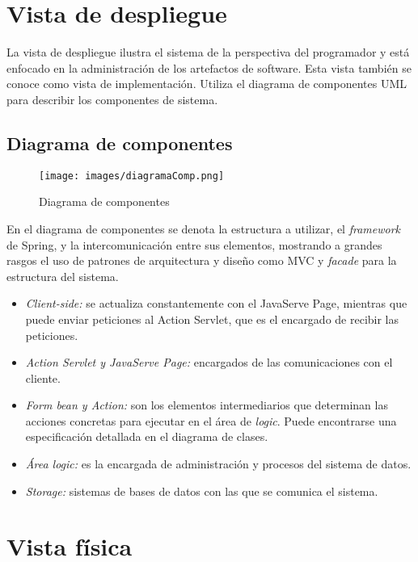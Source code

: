 \documentclass{scrreprt}
\begin{document}
\chapter{Vista de despliegue}

La vista de despliegue ilustra el sistema de la perspectiva del programador y está enfocado en la administración de los artefactos de software. Esta vista también se conoce como vista de implementación. Utiliza el diagrama de componentes UML para describir los componentes de sistema.\\

\section{Diagrama de componentes}

\begin{figure}[H]
	\centering
    \texttt{[image: images/diagramaComp.png]}
    \caption{Diagrama de componentes}
\end{figure}

En el diagrama de componentes se denota la estructura a utilizar, el \textit{framework} de Spring, y la intercomunicación entre sus elementos, mostrando a grandes rasgos el uso de patrones de arquitectura y diseño como MVC y \textit{facade} para la estructura del sistema.

\begin{itemize}
	\item \textit{Client-side:} se actualiza constantemente con el JavaServe Page, mientras que puede enviar peticiones al Action Servlet, que es el encargado de recibir las peticiones. 
	\item \textit{Action Servlet y JavaServe Page:} encargados de las comunicaciones con el cliente. 
    \item \textit{Form bean y Action:} son los elementos intermediarios que determinan las acciones concretas para ejecutar en el área de \textit{logic}. Puede encontrarse una especificación detallada en el diagrama de clases.
    \item \textit{Área logic:} es la encargada de administración y procesos del sistema de datos.
    \item \textit{Storage:} sistemas de bases de datos con las que se comunica el sistema. 
    
\end{itemize}


\chapter{Vista física}
\end{document}
